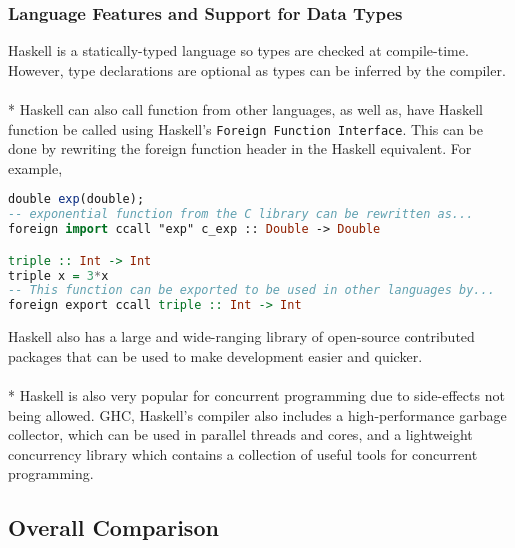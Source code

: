 \subsubsection*{Language Features and Support for Data Types}
Haskell is a statically-typed language so types are checked at compile-time. However, type declarations are optional as types can be inferred by the compiler.\\\\*
Haskell can also call function from other languages, as well as, have Haskell function be called using Haskell's \texttt{Foreign Function Interface}. This can be done by rewriting the foreign function header in the Haskell equivalent. For example,
\begin{lstlisting}[language=Haskell]
double exp(double);
-- exponential function from the C library can be rewritten as...
foreign import ccall "exp" c_exp :: Double -> Double

triple :: Int -> Int
triple x = 3*x
-- This function can be exported to be used in other languages by...
foreign export ccall triple :: Int -> Int
\end{lstlisting}
Haskell also has a large and wide-ranging library of open-source contributed packages that can be used to make development easier and quicker.\\\\*
Haskell is also very popular for concurrent programming due to side-effects not being allowed. GHC, Haskell's compiler also includes a high-performance garbage collector, which can be used in parallel threads and cores, and a lightweight concurrency library which contains a collection of useful tools for concurrent programming.
\subsection*{Overall Comparison}
